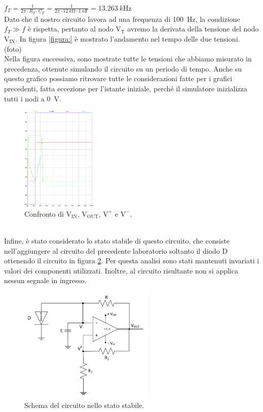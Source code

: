 \documentclass{report}
\begin{document}
\\[4pt]\indent$\displaystyle{f_T = \frac{1}{2\pi\cdot R_T\cdot C_T} = \frac{1}{2\pi\cdot \SI{12}{k\ohm}\cdot\SI{1}{n\farad}} =\SI{13.263}{k\hertz}}$
\\[4pt]Dato che il nostro circuito lavora ad una frequenza di \SI{100}{\hertz}, la condizione $f_T\gg f$ è rispetta, pertanto al nodo $\mathrm{V_T}$ avremo la derivata della tensione del nodo $\mathrm{V_{IN}}$. In figura \ref{figura:} è mostrato l'andamento nel tempo delle due tensioni.
\\(foto)
\\Nella figura successiva, sono mostrate tutte le tensioni che abbiamo misurato in precedenza, ottenute simulando il circuito su un periodo di tempo. Anche su questo grafico possiamo ritrovare tutte le considerazioni fatte per i grafici precedenti, fatta eccezione per l'istante iniziale, perché il simulatore inizializza tutti i nodi a \SI{0}{\volt}. 
\begin{figure}[h!]
	\centering
	\includegraphics[height=5cm]{immagini/plot_sim} %
	\caption{Confronto di $\mathrm{V_{IN}}$, $\mathrm{V_{OUT}}$, $\mathrm{V^+}$ e $\mathrm{V^-}$.}
	\label{figura:simulazione}
\end{figure}
\\Infine, è stato considerato lo stato stabile di questo circuito, che consiste nell'aggiungere al circuito del precedente laboratorio soltanto il diodo D ottenendo il circuito in figura \ref{figura:schema1stabile}. Per questa analisi sono stati mantenuti invariati i valori dei componenti utilizzati. Inoltre, al circuito risultante non si applica nessun segnale in ingresso.
\begin{figure}[h!]
	\centering
	\includegraphics[height=5.5cm]{immagini/schema1stabile}
	\caption{Schema del circuito nello stato stabile.}
	\label{figura:schema1stabile}
\end{figure}
\end{document}
